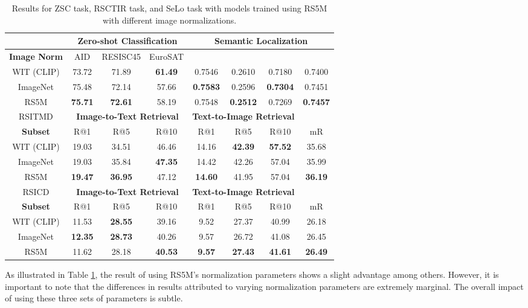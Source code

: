 \documentclass[journal]{IEEEtran}
\begin{document}
\begin{table}[ht]
\caption{Results for ZSC task, RSCTIR task, and SeLo task with models trained using RS5M with different image normalizations.}
\label{table:imagenorm}
\footnotesize
\setlength{\tabcolsep}{1.75pt}
\begin{tabular}{cccccccc}
\toprule
& \multicolumn{3}{c}{\textbf{Zero-shot Classification}} & \multicolumn{4}{c}{\textbf{Semantic Localization}} \\
\midrule
\textbf{Image Norm} & AID & RESISC45 & EuroSAT &  &  &  &  \\
\midrule
 WIT (CLIP) & 73.72 & 71.89 & \textbf{61.49} & 0.7546 & 0.2610 &0.7180 &0.7400 \\
 ImageNet &75.48&72.14&57.66	&\textbf{0.7583} & 0.2596	&\textbf{0.7304}		&0.7451\\
 RS5M &\textbf{75.71}&\textbf{72.61}&58.19 &0.7548&\textbf{0.2512}&0.7269&\textbf{0.7457} \\
\midrule
\midrule
RSITMD & \multicolumn{3}{c}{\textbf{Image-to-Text Retrieval}} & \multicolumn{3}{c}{\textbf{Text-to-Image Retrieval}} & \\
\midrule
\textbf{Subset} &  {R@1} & {R@5} & {R@10} & {R@1} & {R@5} & {R@10} & {mR} \\
 \midrule
  WIT (CLIP) & 19.03 & 	34.51 & 	46.46	 & 14.16	&  \textbf{42.39} & 	\textbf{57.52}  & 	35.68\\
 ImageNet &19.03	&35.84	&\textbf{47.35}	&14.42	&42.26	&57.04	&35.99	\\
 RS5M &\textbf{19.47}	&\textbf{36.95}	&47.12	&\textbf{14.60}	&41.95	&57.04	&\textbf{36.19} \\
\midrule
RSICD & \multicolumn{3}{c}{\textbf{Image-to-Text Retrieval}} & \multicolumn{3}{c}{\textbf{Text-to-Image Retrieval}} & \\
\midrule
\textbf{Subset} &  {R@1} & {R@5} & {R@10} & {R@1} & {R@5} & {R@10} & {mR} \\
 \midrule
  WIT (CLIP) & 11.53  &	\textbf{28.55} 	& 39.16  & 	9.52  & 	27.37 	& 40.99  &	26.18 \\
 ImageNet &\textbf{12.35}	&\textbf{28.73}	&40.26	&9.57	&26.72	&41.08	&26.45\\
 RS5M &11.62	&28.18	&\textbf{40.53}&	\textbf{9.57}&	\textbf{27.43}&	\textbf{41.61} & \textbf{26.49} \\
\bottomrule
\end{tabular}
\end{table}



As illustrated in Table \ref{table:imagenorm}, the result of using RS5M's normalization parameters shows a slight advantage among others. However, it is important to note that the differences in results attributed to varying normalization parameters are extremely marginal. The overall impact of using these three sets of parameters is subtle.
\end{document}
